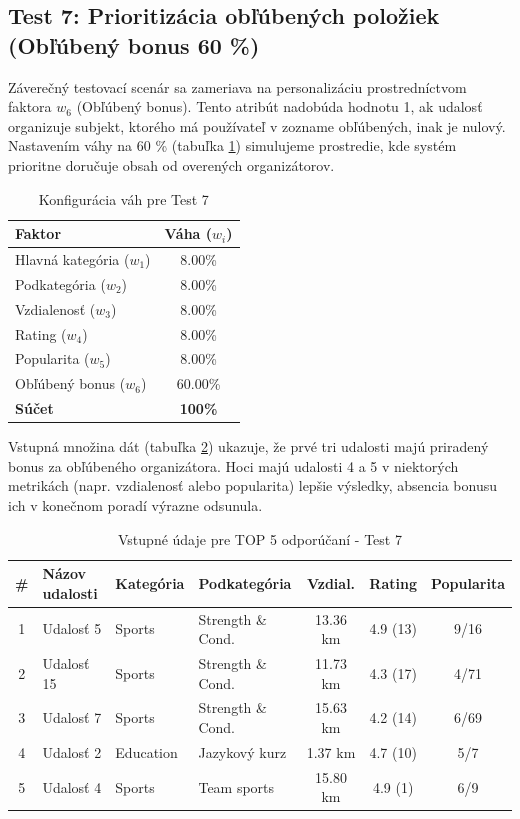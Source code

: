 \subsection{Test 7: Prioritizácia obľúbených položiek (Obľúbený bonus 60 \%)}

Záverečný testovací scenár sa zameriava na personalizáciu prostredníctvom faktora $w_6$ (Obľúbený bonus). Tento atribút nadobúda hodnotu 1, ak udalosť organizuje subjekt, ktorého má používateľ v zozname obľúbených, inak je nulový. Nastavením váhy na 60 \% (tabuľka \ref{tab:vahy_test7}) simulujeme prostredie, kde systém prioritne doručuje obsah od overených organizátorov.

\begin{table}[H]
\centering
\begin{tabular}{|l|c|}
\hline
\textbf{Faktor} & \textbf{Váha ($w_i$)} \\
\hline
Hlavná kategória ($w_1$) & 8.00\% \\
Podkategória ($w_2$) & 8.00\% \\
Vzdialenosť ($w_3$) & 8.00\% \\
Rating ($w_4$) & 8.00\% \\
Popularita ($w_5$) & 8.00\% \\
Obľúbený bonus ($w_6$) & 60.00\% \\
\hline
\textbf{Súčet} & \textbf{100\%} \\
\hline
\end{tabular}
\caption{Konfigurácia váh pre Test 7}
\label{tab:vahy_test7}
\end{table}

Vstupná množina dát (tabuľka \ref{tab:data_test7}) ukazuje, že prvé tri udalosti majú priradený bonus za obľúbeného organizátora. Hoci majú udalosti 4 a 5 v niektorých metrikách (napr. vzdialenosť alebo popularita) lepšie výsledky, absencia bonusu ich v konečnom poradí výrazne odsunula.

\begin{table}[H]
\centering
\small
\begin{tabular}{|c|l|l|l|c|c|c|}
\hline
\textbf{\#} & \textbf{Názov udalosti} & \textbf{Kategória} & \textbf{Podkategória} & \textbf{Vzdial.} & \textbf{Rating} & \textbf{Popularita} \\
\hline
1 & Udalosť 5  & Sports    & Strength \& Cond. & 13.36 km & 4.9 (13) & 9/16 \\
2 & Udalosť 15 & Sports    & Strength \& Cond. & 11.73 km & 4.3 (17) & 4/71 \\
3 & Udalosť 7  & Sports    & Strength \& Cond. & 15.63 km & 4.2 (14) & 6/69 \\
4 & Udalosť 2  & Education & Jazykový kurz     & 1.37 km  & 4.7 (10) & 5/7 \\
5 & Udalosť 4  & Sports    & Team sports       & 15.80 km & 4.9 (1)  & 6/9 \\
\hline
\end{tabular}
\caption{Vstupné údaje pre TOP 5 odporúčaní - Test 7}
\label{tab:data_test7}
\end{table}



